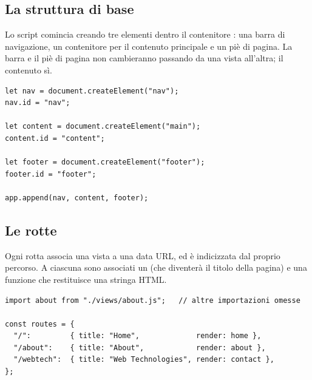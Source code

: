 \subsection{La struttura di base}

Lo script comincia creando tre elementi dentro il contenitore : una
barra di navigazione, un contenitore per il contenuto principale e un piè di
pagina. La barra e il piè di pagina non cambieranno passando da una vista
all'altra; il contenuto sì.

\begin{affianco}[0.5][c]
\begin{lstlisting}[style=js, name=main.js]
let nav = document.createElement("nav");
nav.id = "nav";

let content = document.createElement("main");
content.id = "content";

let footer = document.createElement("footer");
footer.id = "footer";

app.append(nav, content, footer);
\end{lstlisting}
\risultato
\begin{immagine}
\end{immagine}
\end{affianco}

\subsection{Le rotte}

Ogni rotta associa una vista a una data URL, ed è indicizzata dal proprio
percorso. A ciascuna sono associati un  (che diventerà il titolo
della pagina) e una funzione  che restituisce una stringa HTML.

\begin{lstlisting}[style=js, name=main.js]
import about from "./views/about.js";   // altre importazioni omesse

const routes = {
  "/":         { title: "Home",             render: home },
  "/about":    { title: "About",            render: about },
  "/webtech":  { title: "Web Technologies", render: contact },
};
\end{lstlisting}

